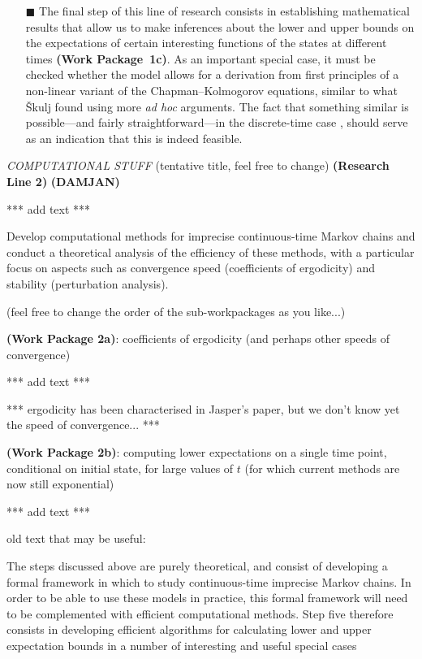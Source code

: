 \documentclass[11pt,dvipsnames,usenames,a4paper]{article}
\begin{document}
\begin{itemize}
\item[\tiny$\blacksquare$]
The final step of this line of research consists in establishing mathematical results that allow us to make inferences about the lower and upper bounds on the expectations of certain interesting functions of the states at different times {\bf(Work Package~1c)}.
As an important special case, it must be checked whether the model allows for a derivation from first principles of a non-linear variant of the Chapman--Kolmogorov equations, similar to what \v{S}kulj \cite{skulj2015:continuous:bounds} found using more {\itshape ad hoc} arguments.
The fact that something similar is possible---and fairly straightforward---in the discrete-time case \cite{cooman2008}, should serve as an indication that this is indeed feasible.

\end{itemize}
\vspace{6pt}



\emph{COMPUTATIONAL STUFF} (tentative title, feel free to change) {\bf (Research Line 2)}
{\bf\color{blue} (DAMJAN)}

*** add text ***

Develop computational methods for imprecise continuous-time Markov chains and conduct a theoretical analysis of the efficiency of these methods, with a particular focus on aspects such as convergence speed (coefficients of ergodicity) and stability (perturbation analysis).

(feel free to change the order of the sub-workpackages as you like...)

{\bf (Work Package 2a)}: coefficients of ergodicity (and perhaps other speeds of convergence)

*** add text ***

*** ergodicity has been characterised in Jasper's paper, but we don't know yet the speed of convergence... ***

{\bf (Work Package 2b)}: computing lower expectations on a single time point, conditional on initial state, for large values of $t$ (for which current methods are now still exponential)

*** add text ***

{\color{Gray}
old text that may be useful:

The steps discussed above are purely theoretical, and consist of developing a formal framework in which to study continuous-time imprecise Markov chains.
In order to be able to use these models in practice, this formal framework will need to be complemented with efficient computational methods.
Step five therefore consists in developing efficient algorithms for calculating lower and upper expectation bounds in a number of interesting and useful special cases
}
\end{document}

